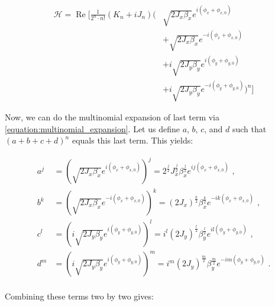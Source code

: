 \begin{equation}
    \begin{aligned}
        \mathcal{H} = \operatorname{Re} \biggl[
            \frac{1}{2^n \cdot n!}  (K_n + iJ_n)
            \biggl(
                & \sqrt{2 J_x \beta_x} e^{i \left( \phi_x + \phi_{x,0} \right)}\\
                & + \sqrt{2 J_x \beta_x} e^{-i \left(\phi_x + \phi_{x,0} \right)}\\
                & + i \sqrt{2 J_y \beta_y} e^{i \left(\phi_y+ \phi_{y,0} \right)} \\
                & + i \sqrt{2 J_y \beta_y} e^{-i \left(\phi_y + \phi_{y,0} \right)} 
            \biggr)^n 
            \biggr]
    \end{aligned}
    \label{equation:hamiltonian_multipole_order_n_xy}
\end{equation}

Now, we can do the multinomial expansion of last term via \cref{equation:multinomial_expansion}.
Let us define \(a\), \(b\), \(c\), and \(d\) such that \(\left( a + b + c + d \right)^n\) equals this last term.
This yields:

\begin{equation}
    \begin{aligned}
        a^j &= \left( \sqrt{2 J_x \beta_x} e^{i \left( \phi_x + \phi_{x,0} \right)} \right)^j = 2^{\frac{j}{2}} J_x^{\frac{j}{2}} \beta_x^{\frac{j}{2}} e^{i j \left( \phi_x + \phi_{x,0} \right)} \text{ ,} \\
        b^k &= \left( \sqrt{2 J_x \beta_x} e^{-i \left( \phi_x + \phi_{x,0} \right)} \right)^k = (2 J_x)^{\frac{k}{2}} \beta_x^{\frac{k}{2}} e^{-i k \left( \phi_x + \phi_{x,0} \right)}           \text{ ,} \\
        c^l &= \left( i \sqrt{2 J_y \beta_y} e^{i \left( \phi_y + \phi_{y,0} \right)} \right)^l = i^l  (2 J_y)^{\frac{l}{2}} \beta_y^{\frac{l}{2}} e^{i l \left( \phi_y + \phi_{y,0} \right)}      \text{ ,} \\
        d^m &= \left( i \sqrt{2 J_y \beta_y} e^{i \left( \phi_y + \phi_{y,0} \right)} \right)^m = i^m (2 J_y)^{\frac{m}{2}} \beta_y^{\frac{m}{2}} e^{-i m \left( \phi_y + \phi_{y,0} \right)}      \text{ .} \\
    \end{aligned}
    \label{equation:variables_definition_for_multinomial_expansion}
\end{equation}

Combining these terms two by two gives:


